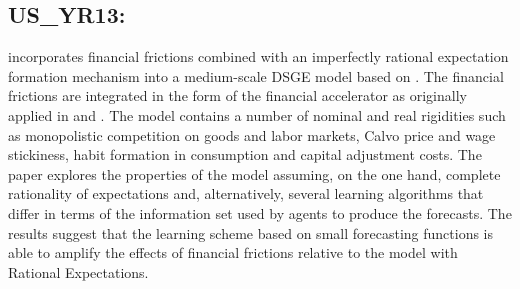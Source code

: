 \documentclass[11pt,a4paper]{article}
\begin{document}
	\subsection{US\_YR13: \texorpdfstring{\cite{rychalovska2016}}{Rychalovska (2016)}}
	\label{USYR13}
	\cite{rychalovska2016} incorporates financial frictions combined with an imperfectly rational expectation formation mechanism into a medium-scale DSGE model based on \cite{SmetsWouters2007}. The financial frictions are integrated in the form of the financial accelerator as originally applied in \cite{bernanke1989agency} and \cite{bernanke1996financial}. The model contains a number of nominal and real rigidities such as monopolistic competition on goods and labor markets, Calvo price and wage stickiness, habit formation in consumption and capital adjustment costs. The paper explores the properties of the model assuming, on the one hand, complete rationality of expectations and, alternatively, several learning algorithms that differ in terms of the information set used by agents to produce the forecasts. The results suggest that the learning scheme based on small forecasting functions is able to amplify the effects of financial frictions relative to the model with Rational Expectations.
	
\end{document}
